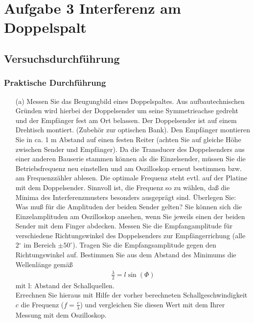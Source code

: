 \documentclass[12pt]{scrartcl}
\begin{document}
\section{Aufgabe 3 Interferenz am Doppelspalt}
\subsection{Versuchsdurchführung}
\subsubsection{Praktische Durchführung}
\begin{itemize}
\item[(a)]
Messen Sie das Beugungbild eines Doppelspaltes. Aus aufbautechnischen Gründen wird hierbei der Doppelsender um seine Symmetrieachse gedreht und der Empfänger fest am Ort belassen. Der Doppelsender ist auf einem Drehtisch montiert. (Zubehör zur optischen Bank). Den Empfänger montieren Sie
in ca. 1 m Abstand auf einen festen Reiter (achten Sie auf gleiche Höhe zwischen Sender und Empfänger). Da die Transducer des Doppelsenders aus einer anderen Bauserie stammen können als die Einzelsender, müssen Sie die Betriebsfrequenz neu einstellen und am Oszilloskop erneut bestimmen bzw. am Frequenzzähler ablesen. Die optimale Frequenz steht evtl. auf der Platine mit dem Doppelsender. Sinnvoll ist, die Frequenz so zu wählen, daß die Minima des Interferenzmusters
besonders ausgeprägt sind. Überlegen Sie: Was muß für die Amplituden der beiden Sender gelten? Sie können sich die Einzelamplituden am Oszilloskop ansehen, wenn Sie jeweils einen der beiden Sender mit dem Finger abdecken.
Messen Sie die Empfangamplitude für verschiedene Richtungswinkel des Doppelsenders zur Empfängerrichung (alle 2$^{\circ}$ im Bereich $\pm 50^{\circ}$). Tragen Sie die Empfangsamplitude gegen den Richtungswinkel auf. Bestimmen Sie aus dem Abstand des Minimums die Wellenlänge gemäß
\begin{align}
\frac{\lambda}{2} = l\sin(\Phi)
\end{align}
mit l: Abstand der Schallquellen.\\
Errechnen Sie hieraus mit Hilfe der vorher berechneten Schallgeschwindigkeit $c$ die Frequenz ($f = \frac{c}{\lambda}$) und vergleichen Sie diesen Wert mit dem Ihrer Messung mit dem Oszilloskop.
\end{itemize}
\end{document}
